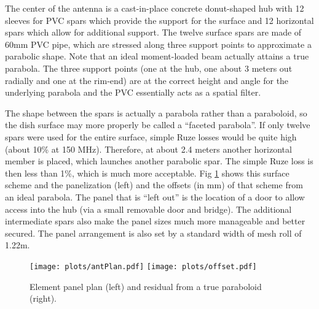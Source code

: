 \documentclass[preprint,11pt]{aastex}
\begin{document}
The center of the antenna is a cast-in-place concrete donut-shaped hub with 12 sleeves for PVC spars which provide the support for the surface and 12 horizontal spars which allow for additional support.  The twelve surface spars are made of 60mm PVC pipe, which are stressed along three support points to approximate a parabolic shape.  Note that an ideal moment-loaded beam actually attains a true parabola.  The three support points (one at the hub, one about 3 meters out radially and one at the rim-end) are at the correct height and angle for the underlying parabola and the PVC essentially acts as a spatial filter.

The shape between the spars is actually a parabola rather than a paraboloid, so the dish surface may more properly be called a ``faceted parabola''.  If only twelve spars were used for the entire surface, simple Ruze losses would be quite high (about 10\% at 150 MHz).  Therefore, at about 2.4 meters another horizontal member is placed, which launches another parabolic spar.  The simple Ruze loss is then less than 1\%, which is much more acceptable.  Fig \ref{fig:elementplan} shows this surface scheme and the panelization (left) and the offsets (in mm) of that scheme from an ideal parabola.  The panel that is ``left out'' is the location of a door to allow access into the hub (via a small removable door and bridge).  The additional intermediate spars also make the panel sizes much more manageable and better secured.  The panel arrangement is also set by a standard width of mesh roll of 1.22m.

\begin{figure}[h!]
\centerline{
\texttt{[image: plots/antPlan.pdf]}
\texttt{[image: plots/offset.pdf]} 
}
\caption{\small Element panel plan (left) and residual from a true paraboloid (right).
\label{fig:elementplan}}
\end{figure}
\end{document}
